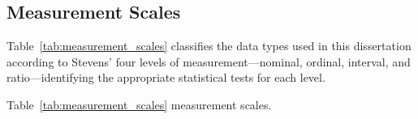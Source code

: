 \fi %

\label{sec:measurement_quality}
\label{tab:measurement_quality_summary}
\label{tab:measurement_scales}
\label{tab:reliability_assessment}
\label{tab:validity_assessment}
\label{tab:measurement_errors}

\iffalse %
\subsection{Measurement Scales}

Table~\ref{tab:measurement_scales} classifies the data types used in this dissertation according to Stevens' four levels of measurement---nominal, ordinal, interval, and ratio---identifying the appropriate statistical tests for each level.


\noindent Table~\ref{tab:measurement_scales} measurement scales.

